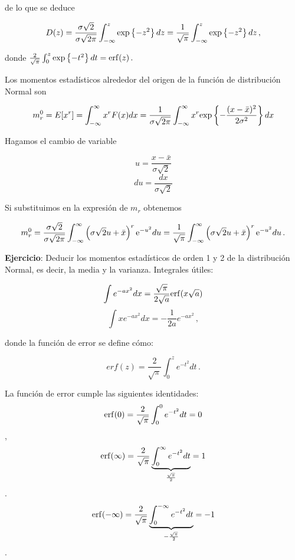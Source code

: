 \documentclass[
]{agujournal2019}
\begin{document}
de lo que se deduce

\[D(z)=\frac{\sigma\sqrt{2}}{\sigma\sqrt{2\pi}}\int^z_{-\infty} {\rm exp}
  \left\{ -z^2 \right\}dz =
  \frac{1}{\sqrt{\pi}}\int^z_{-\infty} {\rm exp}
  \left\{ -z^2 \right\} dz\,,\]

donde
\(\frac{2}{\sqrt{\pi}}\int^z_{0}{\rm exp}\left\{ -t^2 \right\}dt={\rm erf}(z)\,.\)

\begin{center}
\end{center}

Los momentos estadísticos alrededor del origen de la función de
distribución Normal son

\[m^0_r=E[x^r]=\int^{\infty}_{-\infty} x^rF(x)dx=\frac{1}{\sigma\sqrt{2\pi}}\int^{\infty}_{-\infty}x^r{\rm exp}
   \left\{ -\frac{(x-\bar{x})^2}{2\sigma^2} \right\} dx\]

Hagamos el cambio de variable

\[u=\frac{x-\bar{x}}{\sigma\sqrt{2}}\] \[du=\frac{dx}{\sigma\sqrt{2}}\]

Si substituimos en la expresión de \(m_r\) obtenemos

\[m^0_r=\frac{\sigma\sqrt{2}}{\sigma\sqrt{2\pi}}\int^{\infty}_{-\infty}
  \left( \sigma \sqrt{2}u+\bar{x}\right)^r{\rm e}^{-u^2}du=
  \frac{1}{\sqrt{\pi}}\int^{\infty}_{-\infty}\left( \sigma \sqrt{2}u+\bar{x}\right)^r{\rm e}
   ^{-u^2}du\,.\]

\vspace{0.25cm}

\textbf{Ejercicio}: Deducir los momentos estadísticos de orden 1 y 2 de
la distribución Normal, es decir, la media y la varianza. Integrales
útiles:

\[\int e^{-ax^2}dx=\frac{\sqrt{\pi}}{2\sqrt{a}}{\rm erf}(x\sqrt{a})\]
\[\int xe^{-ax^2}dx=-\frac{1}{2a}e^{-ax^2}\,,\]

donde la función de error se define cómo:

\[erf(z)=\frac{2}{\sqrt{\pi}}\int_0^z e^{-t^2} dt\,.\]

La función de error cumple las siguientes identidades:
\[{\rm erf}(0)=\frac{2}{\sqrt{\pi}}\int_0^0 e^{-t^2} dt=0\],
\[{\rm erf}(\infty)=\frac{2}{\sqrt{\pi}}\underbrace{\int_0^\infty e^{-t^2} dt}_{\frac{\sqrt{\pi}}{2}}=1\].
\[{\rm erf}(-\infty)=\frac{2}{\sqrt{\pi}}\underbrace{\int_0^{-\infty} e^{-t^2} dt}_{-\frac{\sqrt{\pi}}{2}}=-1\].

\vspace{0.25cm}
\end{document}
